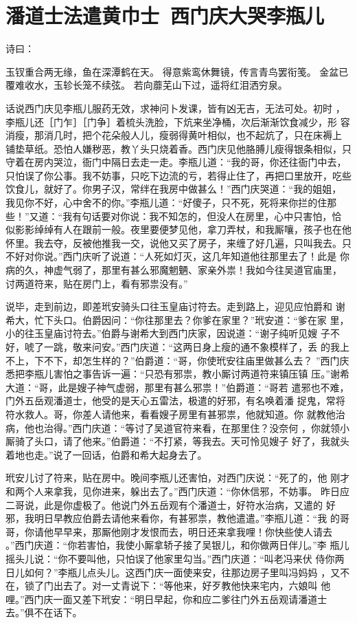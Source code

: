 \chapter{潘道士法遣黄巾士~西门庆大哭李瓶儿}

诗曰：

玉钗重合两无缘，鱼在深潭鹤在天。
得意紫鸾休舞镜，传言青鸟罢衔笺。
金盆已覆难收水，玉轸长笼不续弦。
若向蘼芜山下过，遥将红泪洒穷泉。

话说西门庆见李瓶儿服药无效，求神问卜发课，皆有凶无吉，无法可处。初时
，李瓶儿还［门乍］［门争］着梳头洗脸，下炕来坐净桶，次后渐渐饮食减少，形
容消瘦，那消几时，把个花朵般人儿，瘦弱得黄叶相似，也不起炕了，只在床褥上
铺垫草纸。恐怕人嫌秽恶，教丫头只烧着香。西门庆见他胳膊儿瘦得银条相似，只
守着在房内哭泣，衙门中隔日去走一走。李瓶儿道：“我的哥，你还往衙门中去，
只怕误了你公事。我不妨事，只吃下边流的亏，若得止住了，再把口里放开，吃些
饮食儿，就好了。你男子汉，常绊在我房中做甚么！”西门庆哭道：“我的姐姐，
我见你不好，心中舍不的你。”李瓶儿道：“好傻子，只不死，死将来你拦的住那
些！”又道：“我有句话要对你说：我不知怎的，但没人在房里，心中只害怕，恰
似影影绰绰有人在跟前一般。夜里要便梦见他，拿刀弄杖，和我厮嚷，孩子也在他
怀里。我去夺，反被他推我一交，说他又买了房子，来缠了好几遍，只叫我去。只
不好对你说。”西门庆听了说道：“人死如灯灭，这几年知道他往那里去了！此是
你病的久，神虚气弱了，那里有甚么邪魔魍魉、家亲外祟！我如今往吴道官庙里，
讨两道符来，贴在房门上，看有邪祟没有。”

说毕，走到前边，即差玳安骑头口往玉皇庙讨符去。走到路上，迎见应怕爵和
谢希大，忙下头口。伯爵因问：“你往那里去？你爹在家里？”玳安道：“爹在家
里，小的往玉皇庙讨符去。”伯爵与谢希大到西门庆家，因说道：“谢子纯听见嫂
子不好，唬了一跳，敬来问安。”西门庆道：“这两日身上瘦的通不象模样了，丢
的我上不上，下不下，却怎生样的？”伯爵道：“哥，你使玳安往庙里做甚么去？
”西门庆悉把李瓶儿害怕之事告诉一遍：“只恐有邪祟，教小厮讨两道符来镇压镇
压。”谢希大道：“哥，此是嫂子神气虚弱，那里有甚么邪祟！”伯爵道：“哥若
遣邪也不难，门外五岳观潘道士，他受的是天心五雷法，极遣的好邪，有名唤着潘
捉鬼，常将符水救人。哥，你差人请他来，看看嫂子房里有甚邪祟，他就知道。你
就教他治病，他也治得。”西门庆道：“等讨了吴道官符来看，在那里住？没奈何
，你就领小厮骑了头口，请了他来。”伯爵道：“不打紧，等我去。天可怜见嫂子
好了，我就头着地也走。”说了一回话，伯爵和希大起身去了。

玳安儿讨了符来，贴在房中。晚间李瓶儿还害怕，对西门庆说：“死了的，他
刚才和两个人来拿我，见你进来，躲出去了。”西门庆道：“你休信邪，不妨事。
昨日应二哥说，此是你虚极了。他说门外五岳观有个潘道士，好符水治病，又遣的
好邪，我明日早教应伯爵去请他来看你，有甚邪祟，教他遣遣。”李瓶儿道：“我
的哥哥，你请他早早来，那厮他刚才发恨而去，明日还来拿我哩！你快些使人请去
。”西门庆道：“你若害怕，我使小厮拿轿子接了吴银儿，和你做两日伴儿。”李
瓶儿摇头儿说：“你不要叫他，只怕误了他家里勾当。”西门庆道：“叫老冯来伏
侍你两日儿如何？”李瓶儿点头儿。这西门庆一面使来安，往那边房子里叫冯妈妈
，又不在，锁了门出去了。对一丈青说下：“等他来，好歹教他快来宅内，六娘叫
他哩。”西门庆一面又差下玳安：“明日早起，你和应二爹往门外五岳观请潘道士
去。”俱不在话下。

